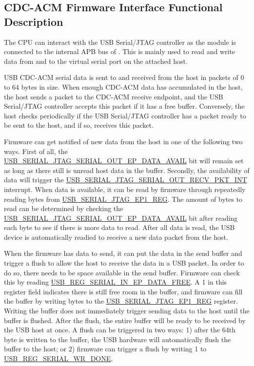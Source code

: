 \documentclass[main\_\_EN.tex]{subfiles}
\begin{document}
\subsection{CDC-ACM Firmware Interface Functional Description}

The CPU can interact with the USB Serial/JTAG controller as the module is connected to the internal APB bus of \chipname{}. This is mainly used to read and write data from and to the virtual serial port on the attached host.

USB CDC-ACM serial data is sent to and received from the host in packets of 0 to 64 bytes in size. When enough CDC-ACM data has accumulated in the host, the host sends a packet to the CDC-ACM receive endpoint, and the USB Serial/JTAG controller accepts this packet if it has a free buffer. Conversely, the host checks periodically if the USB Serial/JTAG controller has a packet ready to be sent to the host, and if so, receives this packet.

Firmware can get notified of new data from the host in one of the following two ways. First of all, the \\\hyperref[fielddesc:USBSERIALJTAGSERIALOUTEPDATAAVAIL]{USB\_SERIAL\_JTAG\_SERIAL\_OUT\_EP\_DATA\_AVAIL}  bit will remain set as long as there still is unread host data in the buffer. Secondly, the availability of data will trigger the  \hyperref[fielddesc:USBSERIALJTAGSERIALOUTRECVPKTINTRAW]{USB\_SERIAL\_JTAG\_SERIAL\_OUT\_RECV\_PKT\_INT} interrupt. When data is available, it can be read by firmware through repeatedly reading bytes from \hyperref[fielddesc:USBSERIALJTAGRDWRBYTE]{USB\_SERIAL\_JTAG\_EP1\_REG}. The amount of bytes to read can be determined by checking the \hyperref[fielddesc:USBSERIALJTAGSERIALOUTEPDATAAVAIL]{USB\_SERIAL\_JTAG\_SERIAL\_OUT\_EP\_DATA\_AVAIL} bit after reading each byte to see if there is more data to read. After all data is read, the USB device is automatically readied to receive a new data packet from the host.

When the firmware has data to send, it can put the data in the send buffer and trigger a flush to allow the host to receive the data in a USB packet. In order to do so, there needs to be space available in the send buffer. Firmware can check this by reading \hyperref[fielddesc:USBSERIALJTAGSERIALINEPDATAFREE]{USB\_REG\_SERIAL\_IN\_EP\_DATA\_FREE}. A 1 in this register field indicates there is still free room in the buffer, and firmware can fill the buffer by writing bytes to the \hyperref[fielddesc:USBSERIALJTAGRDWRBYTE]{USB\_SERIAL\_JTAG\_EP1\_REG} register. Writing the buffer does not immediately trigger sending data to the host until the buffer is flushed. After the flush, the entire buffer will be ready to be received by the USB host at once. A flush can be triggered in two ways: 1) after the 64th byte is written to the buffer, the USB hardware will automatically flush the buffer to the host; or 2) firmware can trigger a flush by writing 1 to \hyperref[fielddesc:USBSERIALJTAGWRDONE]{USB\_REG\_SERIAL\_WR\_DONE}.
\end{document}
